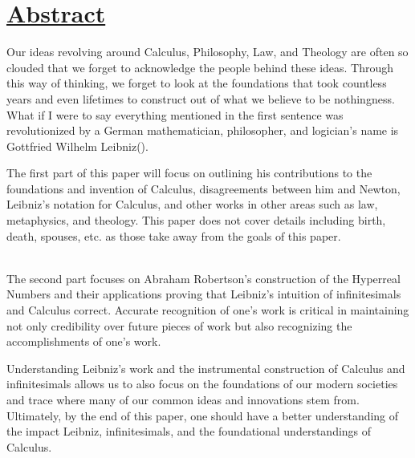 \documentclass[12pt]{report}
\begin{document}

    \newpage
{}
    \newpage



\newpage
\section*{\underline{Abstract}}
Our ideas revolving around Calculus, Philosophy, Law, and Theology are often so clouded that we forget to acknowledge the people behind these ideas.
Through this way of thinking, we forget to look at the foundations that took countless years and even lifetimes to construct out of what we believe to be nothingness.
What if I were to say everything mentioned in the first sentence was revolutionized by a German mathematician, philosopher, and logician's name is Gottfried Wilhelm Leibniz(\citeauthor{Belaval}).
\par The first part of this paper will focus on outlining his contributions to the foundations and invention of Calculus, disagreements between him and Newton, Leibniz's notation for Calculus, and other works in other areas such as law, metaphysics, and theology.
This paper does not cover details including birth, death, spouses, etc. as those take away from the goals of this paper.\par \\
\newline The second part focuses on Abraham Robertson's construction of the Hyperreal Numbers and their applications proving that Leibniz's intuition of infinitesimals and Calculus correct.
Accurate recognition of one's work is critical in maintaining not only credibility over future pieces of work but also recognizing the accomplishments of one's work.
\par Understanding Leibniz's work and the instrumental construction of Calculus and infinitesimals allows us to also focus on the foundations of our modern societies and trace where many of our common ideas and innovations stem from.
Ultimately, by the end of this paper, one should have a better understanding of the impact Leibniz, infinitesimals, and the foundational understandings of Calculus.
\newpage
\end{document}
